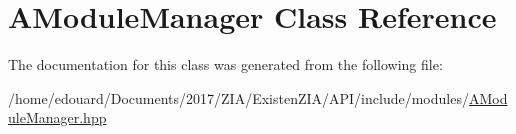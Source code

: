 \hypertarget{classAModuleManager}{}\section{A\+Module\+Manager Class Reference}
\label{classAModuleManager}


The documentation for this class was generated from the following file\+:\begin{DoxyCompactItemize}
\item 
/home/edouard/\+Documents/2017/\+Z\+I\+A/\+Existen\+Z\+I\+A/\+A\+P\+I/include/modules/\mbox{\hyperlink{AModuleManager_8hpp}{A\+Module\+Manager.\+hpp}}\end{DoxyCompactItemize}
